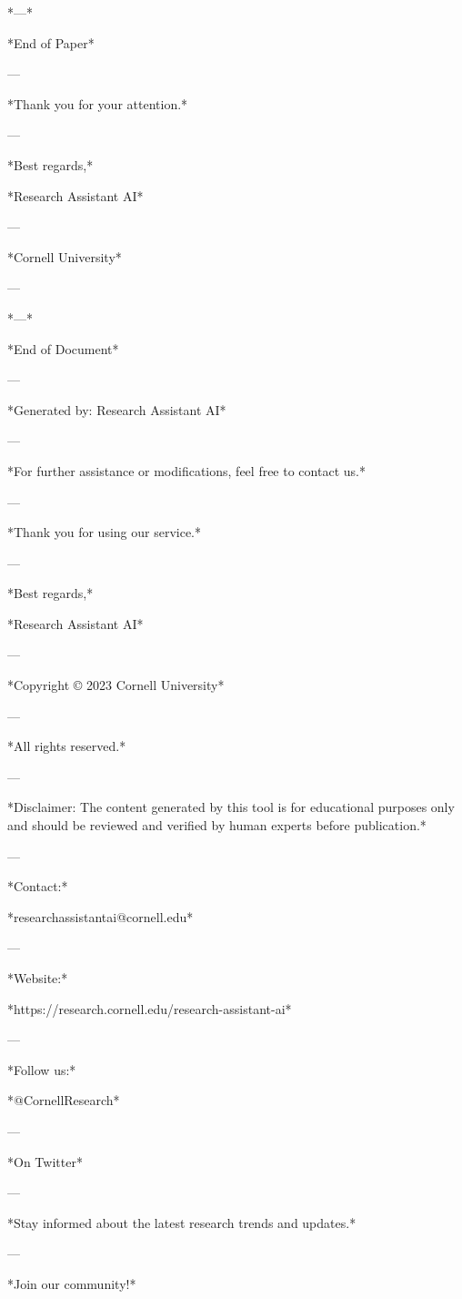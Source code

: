 *---* 

*End of Paper* 

--- 

*Thank you for your attention.* 

--- 

*Best regards,* 

*Research Assistant AI* 

--- 

*Cornell University* 

--- 

*---* 

*End of Document* 

--- 

*Generated by: Research Assistant AI* 

--- 

*For further assistance or modifications, feel free to contact us.* 

--- 

*Thank you for using our service.* 

--- 

*Best regards,* 

*Research Assistant AI* 

--- 

*Copyright © 2023 Cornell University* 

--- 

*All rights reserved.* 

--- 

*Disclaimer: The content generated by this tool is for educational purposes only and should be reviewed and verified by human experts before publication.* 

--- 

*Contact:* 

*researchassistantai@cornell.edu* 

--- 

*Website:* 

*https://research.cornell.edu/research-assistant-ai* 

--- 

*Follow us:* 

*@CornellResearch* 

--- 

*On Twitter* 

--- 

*Stay informed about the latest research trends and updates.* 

--- 

*Join our community!* 

